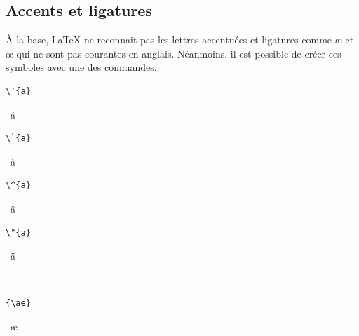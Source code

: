 \subsection{Accents et ligatures}
\label{chap:bases:caracteres:accents}

À la base, {\LaTeX} ne reconnait pas les lettres accentuées et
ligatures comme {\ae} et {\oe} qui ne sont pas courantes en anglais.
Néanmoins, il est possible de créer ces symboles avec une des
commandes.
\begin{demo}
  \begin{minipage}{0.2\linewidth}
    \begin{texample}
\begin{lstlisting}
\'{a}
\end{lstlisting}
      \producing\ \'{a}
    \end{texample}
  \end{minipage}
  \hfill
  \begin{minipage}{0.2\linewidth}
    \begin{texample}
\begin{lstlisting}
\`{a}
\end{lstlisting}
      \producing\ \`{a}
    \end{texample}
  \end{minipage}
  \hfill
  \begin{minipage}{0.2\linewidth}
    \begin{texample}
\begin{lstlisting}
\^{a}
\end{lstlisting}
      \producing\ \^{a}
    \end{texample}
  \end{minipage}
  \hfill
  \begin{minipage}{0.2\linewidth}
    \begin{texample}
\begin{lstlisting}
\"{a}
\end{lstlisting}
      \producing\ \"{a}
    \end{texample}
  \end{minipage} \\
  \hfill
  \begin{minipage}{0.2\linewidth}
    \begin{texample}
\begin{lstlisting}
{\ae}
\end{lstlisting}
      \producing\ \ae
    \end{texample}
  \end{minipage}
  \hfill

\end{demo}
